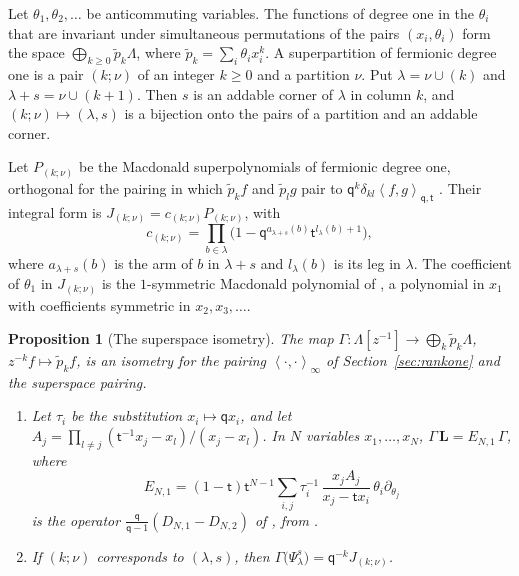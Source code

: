 \documentclass[11pt]{amsart}
\newtheorem{proposition}[theorem]{Proposition}
\theoremstyle{definition}
\theoremstyle{remark}
\newcommand{\Mq}{\mathsf q}                      %
\newcommand{\Mt}{\mathsf t}                      %
\newcommand{\La}{\Lambda}                        %
\newcommand{\ip}[2]{\left\langle #1,#2\right\rangle}
\newcommand{\ipinf}[2]{\left\langle #1,#2\right\rangle_\infty}   %
\newcommand{\LL}{\mathbf L}
\newcommand{\PsiNS}[2]{\Psi_{#1}^{#2}}           %
\newcommand{\Supmap}{\Gamma}                     %
\begin{document}
Let \(\theta_1,\theta_2,\dots\) be anticommuting variables. The functions of degree one in the
\(\theta_i\) that are invariant under simultaneous permutations of the pairs \((x_i,\theta_i)\) form the
space \(\bigoplus_{k\geq0}\tilde p_k\La\), where \(\tilde p_k=\sum_i\theta_ix_i^k\). A superpartition of
fermionic degree one is a pair \((k;\nu)\) of an integer \(k\geq0\) and a partition \(\nu\). Put
\(\lambda=\nu\cup(k)\) and \(\lambda+s=\nu\cup(k+1)\). Then \(s\) is an addable corner of \(\lambda\) in
column \(k\), and \((k;\nu)\mapsto(\lambda,s)\) is a bijection onto the pairs of a partition and an
addable corner.

Let \(P_{(k;\nu)}\) be the Macdonald superpolynomials of fermionic degree one, orthogonal for the
pairing in which \(\tilde p_kf\) and \(\tilde p_lg\) pair to \(\Mq^k\delta_{kl}\ip{f}{g}_{\Mq,\Mt}\)
\cite[Section~4.1]{Comp}. Their integral form is \(J_{(k;\nu)}=c_{(k;\nu)}P_{(k;\nu)}\), with
\[
 c_{(k;\nu)}=\prod_{b\in\lambda}\bigl(1-\Mq^{a_{\lambda+s}(b)}\Mt^{l_\lambda(b)+1}\bigr),
\]
where \(a_{\lambda+s}(b)\) is the arm of \(b\) in \(\lambda+s\) and \(l_\lambda(b)\) is its leg in
\(\lambda\). The coefficient of \(\theta_1\) in \(J_{(k;\nu)}\) is the \(1\)-symmetric Macdonald polynomial
of \cite{Lapointe,Goodberry,CL} \cite[Remark~6]{Lapointe}, a polynomial in \(x_1\) with coefficients
symmetric in \(x_2,x_3,\dots\).

\begin{proposition}[The superspace isometry]\label{prop:superspace}
The map \(\Supmap\colon\La[z^{-1}]\to\bigoplus_k\tilde p_k\La\), \(z^{-k}f\mapsto\tilde p_kf\), is an
isometry for the pairing \(\ipinf{\cdot}{\cdot}\) of Section~\ref{sec:rankone} and the superspace pairing.
\begin{enumerate}
\item[(i)] Let \(\tau_i\) be the substitution \(x_i\mapsto\Mq x_i\), and let
\(A_j=\prod_{l\neq j}(\Mt^{-1}x_j-x_l)/(x_j-x_l)\). In \(N\) variables \(x_1,\dots,x_N\),
\(\Supmap\,\LL=E_{N,1}\,\Supmap\), where
\[
 E_{N,1}=(1-\Mt)\Mt^{N-1}\sum_{i,j}\tau_i^{-1}\,\frac{x_jA_j}{x_j-\Mt x_i}\,\theta_i\partial_{\theta_j}
\]
is the operator \(\frac{\Mq}{\Mq-1}(D_{N,1}-D_{N,2})\) of \cite[Section~4.5]{Comp}, from \cite{BDLM2}.
\item[(ii)] If \((k;\nu)\) corresponds to \((\lambda,s)\), then
\(\Supmap\bigl(\PsiNS{\lambda}{s}\bigr)=\Mq^{-k}J_{(k;\nu)}\).
\end{enumerate}
\end{proposition}
\end{document}
